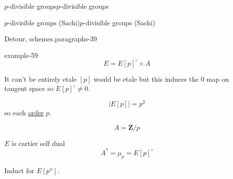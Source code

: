 \documentclass[10pt,]{book}
\numberwithin{equation}{section}
\newcommand{\lb}{[}
\newcommand{\rb}{]}
\newcommand{\ZZ}{\mathbf{Z}}
\begin{document}
\begin{chapterptx}{\(p\)-divisible groups}{}{\(p\)-divisible groups}{}{}
\begin{sectionptx}{\(p\)-divisible groups (Sachi)}{}{\(p\)-divisible groups (Sachi)}{}{}
\begin{paragraphs}{Detour, schemes.}{paragraphs-39}
\begin{example}{}{example-59}
\begin{equation*}
E = E[p]^\circ \times A
\end{equation*}
%
\par
\hypertarget{p-1013}{}%
It can't be entirely etale \(\lb p \rb\) would be etale but this induces the 0 map on tangent space so \(E\lb p \rb^\circ \ne 0\).%
\par
\hypertarget{p-1014}{}%
%
\begin{equation*}
|E\lb p \rb | =  p^2
\end{equation*}
so each \hyperref[def-order-quaternion]{order} \(p\).%
\par
\hypertarget{p-1015}{}%
%
\begin{equation*}
A = \ZZ/p
\end{equation*}
%
\par
\hypertarget{p-1016}{}%
\(E\) is cartier self dual%
\begin{equation*}
A^* = \mu_p = E[p]^\circ
\end{equation*}
%
\par
\hypertarget{p-1017}{}%
Induct for \(E\lb p^n\rb \).%
\end{example}
\end{paragraphs}%
\end{sectionptx}
\end{chapterptx}
%
%
\typeout{************************************************}
\typeout{************************************************}
%
\end{document}
